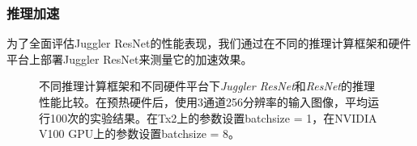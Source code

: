 \subsubsection{推理加速}
为了全面评估Juggler ResNet的性能表现，我们通过在不同的推理计算框架和硬件平台上部署Juggler ResNet来测量它的加速效果。

\begin{figure}[!t]
	\centering
	
	\caption{不同推理计算框架和不同硬件平台下\emph{Juggler ResNet}和\emph{ResNet}的推理性能比较。在预热硬件后，使用3通道256分辨率的输入图像，平均运行100次的实验结果。在Tx2上的参数设置batchsize = 1，在NVIDIA V100 GPU上的参数设置batchsize = 8。}
	\label{speed}
\end{figure}


